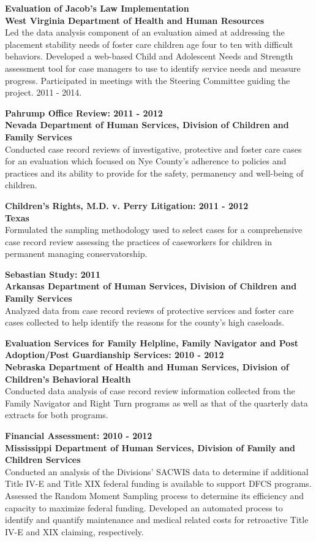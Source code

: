 \documentclass[line, margin, 10pt]{res}
\begin{document}
\begin{resume}
  {\bf Evaluation of Jacob's Law Implementation} \\
  {\bf West Virginia Department of Health and Human Resources} \\
  Led the data analysis component of an evaluation aimed at addressing
  the placement stability needs of foster care children age four to
  ten with difficult behaviors. Developed a web-based Child and
  Adolescent Needs and Strength assessment tool for case managers to
  use to identify service needs and measure progress. Participated in
  meetings with the Steering Committee guiding the project. 2011 -
  2014.

  {\bf Pahrump Office Review: 2011 - 2012}  \\
  {\bf Nevada Department of Human Services, Division of Children and
    Family Services} \\
  Conducted case record reviews of investigative, protective and
  foster care cases for an evaluation which focused on Nye County's
  adherence to policies and practices and its ability to provide for
  the safety, permanency and well-being of children.

  {\bf Children's Rights, M.D. v. Perry Litigation: 2011 - 2012} \\
  {\bf Texas} \\
  Formulated the sampling methodology used to select cases for a
  comprehensive case record review assessing the practices of
  caseworkers for children in permanent managing conservatorship.

  {\bf Sebastian Study: 2011}  \\
  {\bf Arkansas Department of Human Services, Division of Children and
    Family Services} \\
  Analyzed data from case record reviews of protective services and
  foster care cases collected to help identify the reasons for the
  county's high caseloads.

  {\bf Evaluation Services for Family Helpline, Family Navigator and
    Post Adoption/Post Guardianship Services: 2010 - 2012} \\
  {\bf Nebraska Department of Health and Human Services, Division of
    Children's Behavioral Health} \\
  Conducted data analysis of case record review information collected
  from the Family Navigator and Right Turn programs as well as that of
  the quarterly data extracts for both programs.

  {\bf Financial Assessment: 2010 - 2012} \\
  {\bf Mississippi Department of Human Services, Division of Family
    and Children Services} \\
  Conducted an analysis of the Divisions' SACWIS data to determine if
  additional Title IV-E and Title XIX federal funding is available to
  support DFCS programs.  Assessed the Random Moment Sampling process
  to determine its efficiency and capacity to maximize federal
  funding. Developed an automated process to identify and quantify
  maintenance and medical related costs for retroactive Title IV-E and
  XIX claiming, respectively.


\end{resume}
\end{document}
